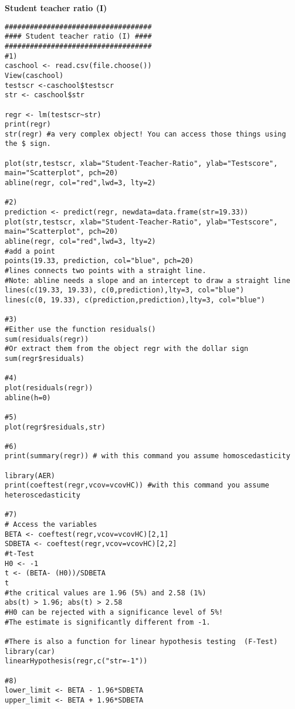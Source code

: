 \begin{Solution}{7.1}
\textbf{Student teacher ratio (I)}

\begin{verbatim}
###################################
#### Student teacher ratio (I) ####
###################################
#1)
caschool <- read.csv(file.choose())
View(caschool)
testscr <-caschool$testscr
str <- caschool$str

regr <- lm(testscr~str)
print(regr)
str(regr) #a very complex object! You can access those things using the $ sign.

plot(str,testscr, xlab="Student-Teacher-Ratio", ylab="Testscore", main="Scatterplot", pch=20)
abline(regr, col="red",lwd=3, lty=2)

#2)
prediction <- predict(regr, newdata=data.frame(str=19.33))
plot(str,testscr, xlab="Student-Teacher-Ratio", ylab="Testscore", main="Scatterplot", pch=20)
abline(regr, col="red",lwd=3, lty=2)
#add a point
points(19.33, prediction, col="blue", pch=20)
#lines connects two points with a straight line.
#Note: abline needs a slope and an intercept to draw a straight line
lines(c(19.33, 19.33), c(0,prediction),lty=3, col="blue")
lines(c(0, 19.33), c(prediction,prediction),lty=3, col="blue")

#3)
#Either use the function residuals()
sum(residuals(regr))
#Or extract them from the object regr with the dollar sign
sum(regr$residuals)

#4)
plot(residuals(regr))
abline(h=0)

#5)
plot(regr$residuals,str)

#6)
print(summary(regr)) # with this command you assume homoscedasticity

library(AER)
print(coeftest(regr,vcov=vcovHC)) #with this command you assume heteroscedasticity

#7)
# Access the variables
BETA <- coeftest(regr,vcov=vcovHC)[2,1]
SDBETA <- coeftest(regr,vcov=vcovHC)[2,2]
#t-Test
H0 <- -1
t <- (BETA- (H0))/SDBETA
t
#the critical values are 1.96 (5%) and 2.58 (1%)
abs(t) > 1.96; abs(t) > 2.58
#H0 can be rejected with a significance level of 5%!
#The estimate is significantly different from -1.

#There is also a function for linear hypothesis testing  (F-Test)
library(car)
linearHypothesis(regr,c("str=-1"))

#8)
lower_limit <- BETA - 1.96*SDBETA
upper_limit <- BETA + 1.96*SDBETA


\end{verbatim}
\end{Solution}
